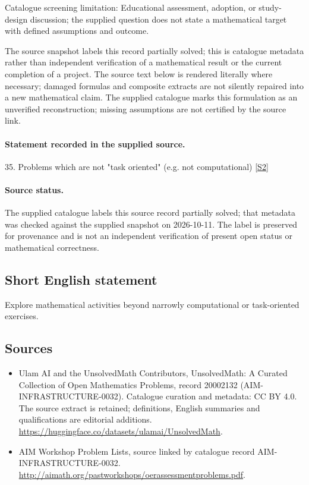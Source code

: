 \documentclass[11pt]{article}
\begin{document}
Catalogue screening limitation: Educational assessment, adoption, or study-design discussion; the supplied question does not state a mathematical target with defined assumptions and outcome.

The source snapshot labels this record partially solved; this is catalogue metadata rather than independent verification of a mathematical result or the current completion of a project.
The source text below is rendered literally where necessary; damaged formulas and composite extracts are not silently repaired into a new mathematical claim.
The supplied catalogue marks this formulation as an unverified reconstruction; missing assumptions are not certified by the source link.
\paragraph{Statement recorded in the supplied source.}
35. Problems which are not "task oriented" (e.g. not computational) \href{http://aimath.org/pastworkshops/oerassessmentproblems.pdf}{[S2]}
\paragraph{Source status.}
The supplied catalogue labels this source record partially solved; that metadata was checked against the supplied snapshot on 2026-10-11. The label is preserved for provenance and is not an independent verification of present open status or mathematical correctness.
\subsection{Short English statement}
Explore mathematical activities beyond narrowly computational or task-oriented exercises.
\subsection{Sources}
\begin{itemize}
\item[S1] Ulam AI and the UnsolvedMath Contributors, UnsolvedMath: A Curated Collection of Open Mathematics Problems, record 20002132 (AIM-INFRASTRUCTURE-0032). Catalogue curation and metadata: CC BY 4.0. The source extract is retained; definitions, English summaries and qualifications are editorial additions.
\url{https://huggingface.co/datasets/ulamai/UnsolvedMath}.
\item[S2] AIM Workshop Problem Lists, source linked by catalogue record AIM-INFRASTRUCTURE-0032.
\url{http://aimath.org/pastworkshops/oerassessmentproblems.pdf}.
\end{itemize}
\end{document}
